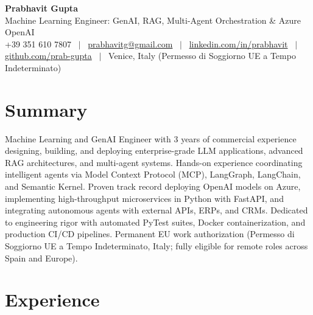 \documentclass[a4paper,10pt]{article}
\begin{document}
\begin{minipage}[c]{0.80\textwidth}
  {\Huge\bfseries Prabhavit Gupta}\\[3pt]
  {\color{accent}\large Machine Learning Engineer: GenAI, RAG, Multi-Agent Orchestration \& Azure OpenAI}\\[6pt]
  {\footnotesize +39 351 610 7807 ~$\vert$~
  \href{mailto:prabhavitg@gmail.com}{prabhavitg@gmail.com} ~$\vert$~
  \href{https://www.linkedin.com/in/prabhavit/}{linkedin.com/in/prabhavit} ~$\vert$~
  \href{https://github.com/prab-gupta}{github.com/prab-gupta} ~$\vert$~
  Venice, Italy (Permesso di Soggiorno UE a Tempo Indeterminato)}
\end{minipage}\hfill

\section{Summary}
Machine Learning and GenAI Engineer with 3 years of commercial experience designing, building, and deploying enterprise-grade LLM applications, advanced RAG architectures, and multi-agent systems. Hands-on experience coordinating intelligent agents via Model Context Protocol (MCP), LangGraph, LangChain, and Semantic Kernel. Proven track record deploying OpenAI models on Azure, implementing high-throughput microservices in Python with FastAPI, and integrating autonomous agents with external APIs, ERPs, and CRMs. Dedicated to engineering rigor with automated PyTest suites, Docker containerization, and production CI/CD pipelines. Permanent EU work authorization (Permesso di Soggiorno UE a Tempo Indeterminato, Italy; fully eligible for remote roles across Spain and Europe).

\section{Experience}
\end{document}
